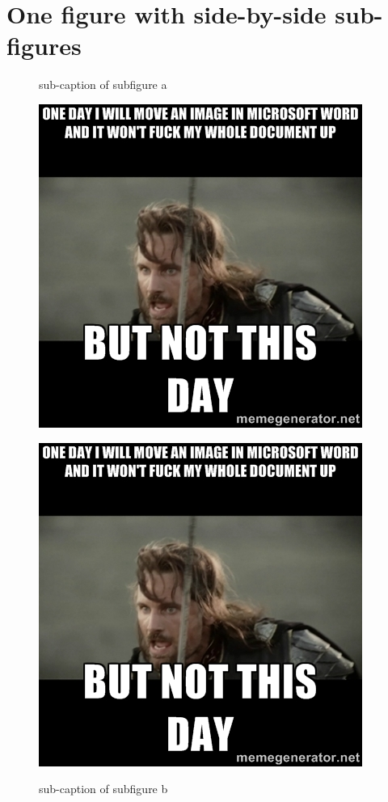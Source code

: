 \documentclass{article}
\begin{document}
\vspace{2cm}

\section{One figure with side-by-side sub-figures}

\begin{figure}[h]
    \ffigbox
    {
    \begin{subfloatrow}[3]
        \ffigbox
        {
         \caption{sub-caption of subfigure a}
         \label{subfig1}
        }
        {\includegraphics[width=\linewidth]{./img/62392602}}
        
        \ffigbox
        {
         \caption{sub-caption of subfigure b}
         \label{subfig2}
        }
        {\includegraphics[width=\linewidth]{./img/62392602}}
        

\end{subfloatrow}}
\end{figure}
\end{document}
